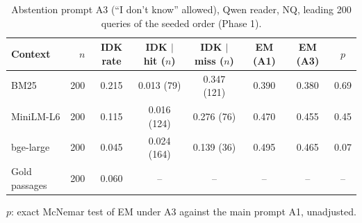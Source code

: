\begin{table}[t]
\centering
\small
\caption{Abstention prompt A3 (``I don't know'' allowed), Qwen reader, NQ, leading 200 queries of the seeded order (Phase 1).}
\label{tab:idk}
\begin{tabular}{lrcccccc}
\toprule
Context & $n$ & IDK rate & IDK $\mid$ hit ($n$) & IDK $\mid$ miss ($n$) & EM (A1) & EM (A3) & $p$ \\
\midrule
BM25 & 200 & 0.215 & 0.013 (79) & 0.347 (121) & 0.390 & 0.380 & 0.69 \\
MiniLM-L6 & 200 & 0.115 & 0.016 (124) & 0.276 (76) & 0.470 & 0.455 & 0.45 \\
bge-large & 200 & 0.045 & 0.024 (164) & 0.139 (36) & 0.495 & 0.465 & 0.07 \\
Gold passages & 200 & 0.060 & -- & -- & -- & -- & -- \\
\bottomrule
\end{tabular}
\par\smallskip\parbox{\linewidth}{\footnotesize $p$: exact McNemar test of EM under A3 against the main prompt A1, unadjusted.}
\end{table}
